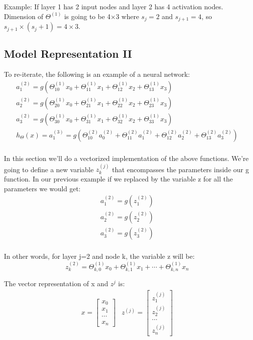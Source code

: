\documentclass{report}
\begin{document}
Example: If layer 1 has 2 input nodes and layer 2 has 4 activation nodes. Dimension of $\Theta^{(1)}$ is going to be 4×3 where $s_j = 2$ and $s_{j+1} = 4$, so $s_{j+1} \times (s_j + 1) = 4 \times 3$.

\subsection{Model Representation II}
To re-iterate, the following is an example of a neural network:
\begin{align*} 
	a_1^{(2)} = g(\Theta_{10}^{(1)}x_0 + \Theta_{11}^{(1)}x_1 + \Theta_{12}^{(1)}x_2 + \Theta_{13}^{(1)}x_3) \\ 
	a_2^{(2)} = g(\Theta_{20}^{(1)}x_0 + \Theta_{21}^{(1)}x_1 + \Theta_{22}^{(1)}x_2 + \Theta_{23}^{(1)}x_3) \\
	a_3^{(2)} = g(\Theta_{30}^{(1)}x_0 + \Theta_{31}^{(1)}x_1 + \Theta_{32}^{(1)}x_2 + \Theta_{33}^{(1)}x_3) \\ 
	h_\Theta(x) = a_1^{(3)} = g(\Theta_{10}^{(2)}a_0^{(2)} + \Theta_{11}^{(2)}a_1^{(2)} + \Theta_{12}^{(2)}a_2^{(2)} + \Theta_{13}^{(2)}a_3^{(2)}) \\ 
\end{align*}

In this section we'll do a vectorized implementation of the above functions. We're going to define a new variable $z_k^{(j)}$  that encompasses the parameters inside our g function. In our previous example if we replaced by the variable z for all the parameters we would get:
\begin{align*}
	a_1^{(2)} = g(z_1^{(2)}) \\ 
	a_2^{(2)} = g(z_2^{(2)}) \\ 
	a_3^{(2)} = g(z_3^{(2)}) \\ 
\end{align*}

In other words, for layer j=2 and node k, the variable z will be:
$$z_k^{(2)} = \Theta_{k,0}^{(1)}x_0 + \Theta_{k,1}^{(1)}x_1 + \cdots + \Theta_{k,n}^{(1)}x_n$$

The vector representation of x and $z^j$ is:
\begin{align*}
	x = \begin{bmatrix}x_0 \\ x_1 \\ \cdots \\ x_n\end{bmatrix} 
	&z^{(j)} = \begin{bmatrix}z_1^{(j)} \\ z_2^{(j)} \\ \cdots \\ z_n^{(j)} \end{bmatrix}
\end{align*}
\end{document}
